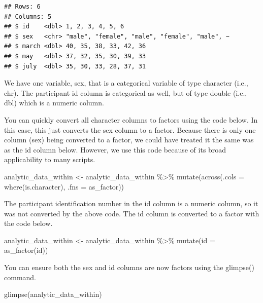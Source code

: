 \documentclass[
]{krantz}
\makeatletter
\newenvironment{Shaded}{\begin{snugshade}}{\end{snugshade}}
\newcommand{\AttributeTok}[1]{\textcolor[rgb]{0.61,0.61,0.61}{#1}}
\newcommand{\FunctionTok}[1]{\textcolor[rgb]{0,0,0}{#1}}
\newcommand{\NormalTok}[1]{#1}
\newcommand{\OtherTok}[1]{\textcolor[rgb]{0.37,0.37,0.37}{#1}}
\newcommand{\SpecialCharTok}[1]{\textcolor[rgb]{0,0,0}{#1}}
\newenvironment{kframe}{%
\medskip{}
\setlength{\fboxsep}{.8em}
 \def\at@end@of@kframe{}%
 \ifinner\ifhmode%
  \def\at@end@of@kframe{\end{minipage}}%
  \begin{minipage}{\columnwidth}%
 \fi\fi%
 \def\FrameCommand##1{\hskip\@totalleftmargin \hskip-\fboxsep
 \colorbox{shadecolor}{##1}\hskip-\fboxsep
     \hskip-\linewidth \hskip-\@totalleftmargin \hskip\columnwidth}%
 \MakeFramed {\advance\hsize-\width
   \@totalleftmargin\z@ \linewidth\hsize
   \@setminipage}}%
 {\par\unskip\endMakeFramed%
 \at@end@of@kframe}
\renewenvironment{Shaded}{\begin{kframe}}{\end{kframe}}
\makeatother
\begin{document}
\begin{verbatim}
## Rows: 6
## Columns: 5
## $ id    <dbl> 1, 2, 3, 4, 5, 6
## $ sex   <chr> "male", "female", "male", "female", "male", ~
## $ march <dbl> 40, 35, 38, 33, 42, 36
## $ may   <dbl> 37, 32, 35, 30, 39, 33
## $ july  <dbl> 35, 30, 33, 28, 37, 31
\end{verbatim}

We have one variable, sex, that is a categorical variable of type character (i.e., chr). The participant id column is categorical as well, but of type double (i.e., dbl) which is a numeric column.

You can quickly convert all character columns to factors using the code below. In this case, this just converts the sex column to a factor. Because there is only one column (sex) being converted to a factor, we could have treated it the same was as the id column below. However, we use this code because of its broad applicability to many scripts.

\begin{Shaded}
\begin{Highlighting}[]
\NormalTok{analytic\_data\_within }\OtherTok{\textless{}{-}}\NormalTok{ analytic\_data\_within }\SpecialCharTok{\%\textgreater{}\%}
  \FunctionTok{mutate}\NormalTok{(}\FunctionTok{across}\NormalTok{(}\AttributeTok{.cols =} \FunctionTok{where}\NormalTok{(is.character),}
                \AttributeTok{.fns =}\NormalTok{ as\_factor))}
\end{Highlighting}
\end{Shaded}

The participant identification number in the id column is a numeric column, so it was not converted by the above code. The id column is converted to a factor with the code below.

\begin{Shaded}
\begin{Highlighting}[]
\NormalTok{analytic\_data\_within }\OtherTok{\textless{}{-}}\NormalTok{ analytic\_data\_within }\SpecialCharTok{\%\textgreater{}\%}
  \FunctionTok{mutate}\NormalTok{(}\AttributeTok{id =} \FunctionTok{as\_factor}\NormalTok{(id))}
\end{Highlighting}
\end{Shaded}

You can ensure both the sex and id columns are now factors using the glimpse() command.

\begin{Shaded}
\begin{Highlighting}[]
\FunctionTok{glimpse}\NormalTok{(analytic\_data\_within)}
\end{Highlighting}
\end{Shaded}
\end{document}
